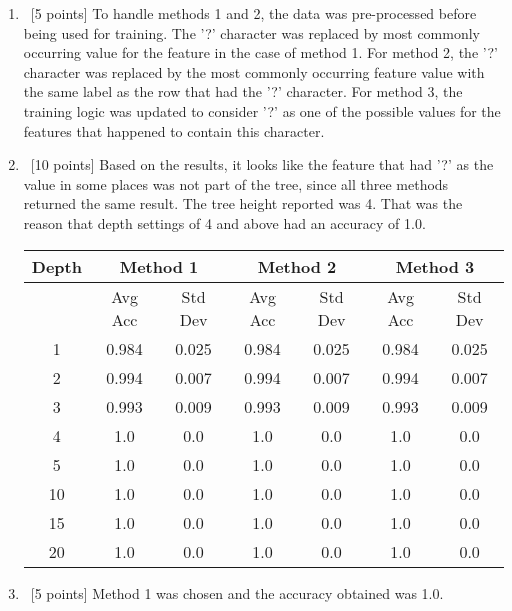 \begin{enumerate}

  
\item ~[5 points] To handle methods 1 and 2, the data was pre-processed before being used for training. The '?' character was replaced by most commonly occurring value for the feature in the case of method 1. For method 2, the '?' character was replaced by the most commonly occurring feature value with the same label as the row that had the '?' character. For method 3, the training logic was updated to consider '?' as one of the possible values for the features that happened to contain this character.
  
\item ~[10 points] Based on the results, it looks like the feature that had '?' as the value in some places was not part of the tree, since all three methods returned the same result. The tree height reported was 4. That was the reason that depth settings of 4 and above had an accuracy of 1.0.
\begin{table}[!htbp]
\centering
\begin{tabular}{*7c}
\toprule
Depth &  \multicolumn{2}{c}{Method 1} & \multicolumn{2}{c}{Method 2} & \multicolumn{2}{c}{Method 3}\\
\midrule
{}   & Avg \; Acc   & Std \; Dev    & Avg \; Acc   & Std \; Dev   & Avg \; Acc   & Std \; Dev\\
1   &  0.984 & 0.025  & 0.984 & 0.025 & 0.984 & 0.025\\
2   & 0.994  & 0.007  & 0.994 &  0.007 & 0.994 & 0.007\\
3   &  0.993 &  0.009 & 0.993 & 0.009 & 0.993 & 0.009\\
4   & 1.0  & 0.0  & 1.0 & 0.0 & 1.0 & 0.0\\
5   &  1.0 & 0.0  & 1.0 & 0.0  & 1.0 & 0.0\\
10   & 1.0  & 0.0  & 1.0 & 0.0  & 1.0 & 0.0\\
15   & 1.0  & 0.0  & 1.0 & 0.0 & 1.0 & 0.0\\
20   & 1.0  & 0.0  & 1.0 & 0.0 & 1.0 & 0.0\\
\bottomrule
\end{tabular}
\end{table}
  
\item ~[5 points] Method 1 was chosen and the accuracy obtained was 1.0.
\end{enumerate}





